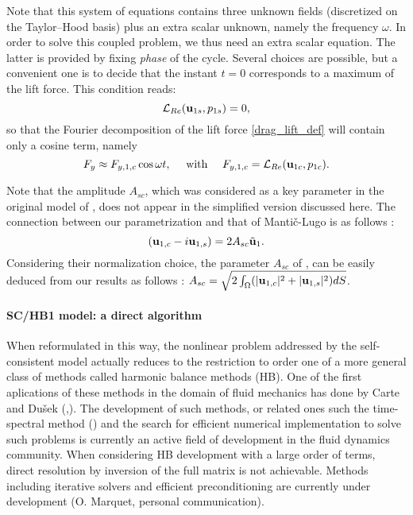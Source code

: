 \documentclass[twocolumn,10pt]{asme2ej}
\newcommand{\be}[1]{ \begin{equation} \label{#1}}
\newcommand{\ee}{\end{equation}}
\begin{document}

Note that this system of equations contains three unknown fields (discretized on the Taylor--Hood basis) plus an extra scalar unknown, 
namely the frequency $\omega$. 
In order to solve this coupled problem, we thus need an extra scalar equation. The latter is provided by fixing {\em phase} of the cycle. Several choices are possible, but a convenient one is to decide that the instant $t=0$ corresponds to a maximum of the lift force.
This condition reads:
\be{HBphase}
{\cal L}_{Re}({\bf u}_{1s},p_{1s}) =0, 
\ee
so that the Fourier decomposition of the lift force \ref{drag_lift_def} will contain only a cosine term, namely 
\be{FySC}
F_y \approx F_{y,1,c} \cos \omega t, \quad \mbox{ with } \quad F_{y,1,c} = {\cal L}_{Re}({\bf u}_{1c},p_{1c}).
\ee 


Note that the amplitude $A_{sc}$, which was considered as a key parameter in the original model of \cite{MLugo2014}, 
does not appear in the simplified version discussed here. The connection between our parametrization and that of Manti\v{c}-Lugo is as follows :
\be{HBtoSC}
\left( {\bf u }_{1,c} - i {\bf u }_{1,s} \right) = 2 A_{sc} \tilde{{\bf u }}_1.
\ee 
Considering their normalization choice, the parameter $A_{sc}$ of \cite{MLugo2014},  can be easily deduced from our results as follows :
$A_{sc} = \sqrt{2 \int_\Omega ( |{\bf u }_{1,c}|^2+ |{\bf u }_{1,s}|^2) d S} $.








\paragraph{SC/HB1 model: a direct algorithm }


When reformulated in this way, the nonlinear problem addressed by the self-consistent model actually reduces to the restriction to order one of a more general class of methods called harmonic balance methods (HB). One of the first aplications of these methods in the domain of fluid mechanics has done by Carte and Du\v{s}ek (\cite{CarteDusek1995},\cite{CarteDusekfraunie1996}). The development of such methods, or related ones such the time-spectral method (\cite{HallThomasClark2002}) and the search for efficient numerical implementation to solve such problems is currently an active field of development in the fluid dynamics community. When considering HB development with a large order of terms, direct resolution by inversion of the full matrix is not achievable. Methods including iterative solvers and efficient preconditioning are currently under development (O. Marquet, personal communication). 
\end{document}
